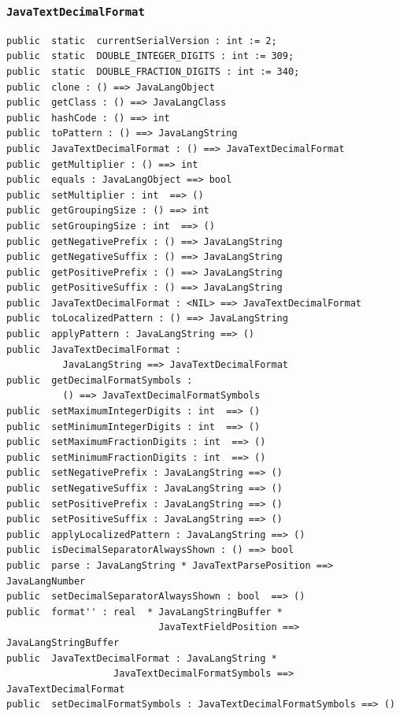 \documentclass[\pformat,12pt]{article}
\begin{document}
\subsubsection{\texttt{JavaTextDecimalFormat}}
\begin{small}
\begin{verbatim}
public  static  currentSerialVersion : int := 2;
public  static  DOUBLE_INTEGER_DIGITS : int := 309;
public  static  DOUBLE_FRACTION_DIGITS : int := 340;
public  clone : () ==> JavaLangObject
public  getClass : () ==> JavaLangClass
public  hashCode : () ==> int
public  toPattern : () ==> JavaLangString
public  JavaTextDecimalFormat : () ==> JavaTextDecimalFormat
public  getMultiplier : () ==> int
public  equals : JavaLangObject ==> bool
public  setMultiplier : int  ==> ()
public  getGroupingSize : () ==> int
public  setGroupingSize : int  ==> ()
public  getNegativePrefix : () ==> JavaLangString
public  getNegativeSuffix : () ==> JavaLangString
public  getPositivePrefix : () ==> JavaLangString
public  getPositiveSuffix : () ==> JavaLangString
public  JavaTextDecimalFormat : <NIL> ==> JavaTextDecimalFormat
public  toLocalizedPattern : () ==> JavaLangString
public  applyPattern : JavaLangString ==> ()
public  JavaTextDecimalFormat : 
          JavaLangString ==> JavaTextDecimalFormat
public  getDecimalFormatSymbols : 
          () ==> JavaTextDecimalFormatSymbols
public  setMaximumIntegerDigits : int  ==> ()
public  setMinimumIntegerDigits : int  ==> ()
public  setMaximumFractionDigits : int  ==> ()
public  setMinimumFractionDigits : int  ==> ()
public  setNegativePrefix : JavaLangString ==> ()
public  setNegativeSuffix : JavaLangString ==> ()
public  setPositivePrefix : JavaLangString ==> ()
public  setPositiveSuffix : JavaLangString ==> ()
public  applyLocalizedPattern : JavaLangString ==> ()
public  isDecimalSeparatorAlwaysShown : () ==> bool
public  parse : JavaLangString * JavaTextParsePosition ==> JavaLangNumber
public  setDecimalSeparatorAlwaysShown : bool  ==> ()
public  format'' : real  * JavaLangStringBuffer * 
                           JavaTextFieldPosition ==> JavaLangStringBuffer
public  JavaTextDecimalFormat : JavaLangString * 
                   JavaTextDecimalFormatSymbols ==> JavaTextDecimalFormat
public  setDecimalFormatSymbols : JavaTextDecimalFormatSymbols ==> ()
\end{verbatim}
\end{small}
\end{document}
